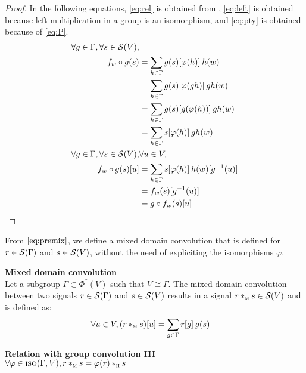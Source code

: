 \begin{proof}
In the following equations, \eqref{eq:rel} is obtained from , \eqref{eq:left} is obtained because left multiplication in a group is an isomorphism, and \eqref{eq:pty} is obtained because of \eqref{eq:P}.
\begin{align}
\forall g \in \Gamma, \forall s \in \cs(V), & \nonumber\\
f_w \circ g (s) & = \displaystyle \sum_{h \in \Gamma} g(s)[\varphi(h)] \h{2} h(w)\label{eq:rel}\\
 & = \displaystyle \sum_{h \in \Gamma} g(s)[\varphi(gh)] \h{2} gh(w)\label{eq:left}\\
 & = \displaystyle \sum_{h \in \Gamma} g(s)[g(\varphi(h))] \h{2} gh(w)\label{eq:pty}\\
 & = \displaystyle \sum_{h \in \Gamma} s[\varphi(h)] \h{2} gh(w)\nonumber\\
\forall g \in \Gamma, \forall s \in \cs(V), & \forall u \in V, \nonumber\\
f_w \circ g (s) [u] & = \displaystyle \sum_{h \in \Gamma} s[\varphi(h)] \h{2} h(w)[g^{-1}(u)]\nonumber\\
& = f_w (s) [g^{-1}(u)]\nonumber\\
& = g \circ f_w (s) [u]\nonumber
\end{align}
\end{proof}

From $\eqref{eq:premix}$, we define a mixed domain convolution \ie that is defined for $r \in \cs(\Gamma)$ and $s \in \cs(V)$, without the need of expliciting the isomorphisms $\varphi$.

\begin{definition}\textbf{Mixed domain convolution}\\
Let a subgroup $\Gamma \subset \Phi^*(V)$ such that $V \cong \Gamma$.
The mixed domain convolution between two signals $r \in \cs(\Gamma)$ and $s \in \cs(V)$ results in a signal $r \ast_{\M} s \in \cs(V)$ and is defined as:
\begin{align*}
\forall u \in V, (r \ast_{\M} s) [u] & = \displaystyle \sum_{g \in \Gamma} r[g] \h{2} g(s)
\end{align*}
\label{def:convm}
\end{definition}

\begin{proposition}\textbf{Relation with group convolution III}\\
$\forall \varphi \in \iso(\Gamma, V), r \ast_{\M} s = \varphi(r) \ast_{\II} s$
\end{proposition}


